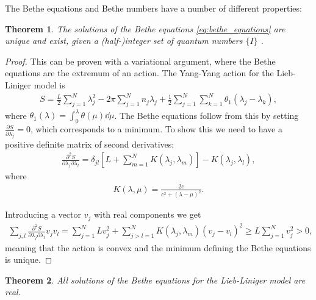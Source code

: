 \documentclass[11pt, a4paper]{report} %
\newtheorem{theorem}{Theorem}
\begin{document}
The Bethe equations and Bethe numbers have a number of different properties:

\begin{theorem}
\begin{sloppypar}
\noindent
The solutions of the Bethe equations \cref{eq:bethe_equations} are unique and exist, given a \mbox{(half-)integer} set of quantum numbers \(\{I\}\) \textup{\cite{Yang1969}}.
\end{sloppypar}
\end{theorem}
\begin{proof}
This can be proven with a variational argument, where the Bethe equations are the extremum of an action.
The Yang-Yang action for the Lieb-Liniger model is
\begin{align}
	S= \frac{L}{2} \sum_{j=1}^{N} \lambda_j^2 - 2\pi\sum_{j=1}^{N} n_j \lambda_j + \frac{1}{2} \sum_{j=1}^N \sum_{k=1}^{N} \theta_1(\lambda_j - \lambda_k),
\end{align}
where \(\theta_1(\lambda) = \int_0^{\lambda} \theta(\mu)\dd\mu\).
The Bethe equations follow from this by setting \(\frac{\partial S}{\partial \lambda_j} = 0\), which corresponds to a minimum.
To show this we need to have a positive definite matrix of second derivatives:
\begin{align}
	\frac{\partial^2S}{\partial\lambda_j\partial\lambda_l} = \delta_{jl} \left[L + \sum_{m=1}^{N} K(\lambda_j,\lambda_m)\right] - K(\lambda_j, \lambda_l),
\end{align}
where 
\begin{align}
	K(\lambda, \mu) = \frac{2c}{c^2 + (\lambda - \mu)^2}.
\end{align}

Introducing a vector \(v_j\) with real components we get \cite{Korepin1993}
\begin{align}
  	\sum_{j,l}\frac{\partial^2S}{\partial\lambda_j\partial\lambda_l} v_jv_l = \sum_{j=1}^NL v_j^2 + \sum_{j>l=1}^{N} K(\lambda_j,\lambda_m) (v_j - v_l)^2 \geq L \sum_{j=1}^Nv_j^2 > 0,
\end{align}
meaning that the action is convex and the minimum defining the Bethe equations is unique.
\end{proof}

\begin{theorem}
All solutions of the Bethe equations for the Lieb-Liniger model are real.
\end{theorem}
\end{document}
